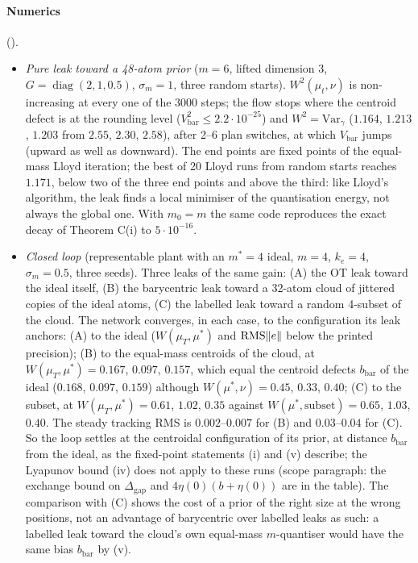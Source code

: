 \paragraph{Numerics} ().
\begin{itemize}
  \item \emph{Pure leak toward a 48-atom prior} ($m = 6$, lifted dimension 3, $G = \operatorname{diag}(2,1,0.5)$,
    $\sigma_m = 1$, three random starts). $W^2(\mu_t,\nu)$ is non-increasing at every one of the 3000 steps; the flow
    stops where the centroid defect is at the rounding level ($V_{\mathrm{bar}}^2 \le 2.2\cdot10^{-25}$) and
    $W^2 = \mathrm{Var}_\gamma$ ($1.164$, $1.213$, $1.203$ from $2.55$, $2.30$, $2.58$), after 2--6 plan switches, at
    which $V_{\mathrm{bar}}$ jumps (upward as well as downward). The end points are fixed points of the equal-mass
    Lloyd iteration; the best of 20 Lloyd runs from random starts reaches $1.171$, below two of the three end points
    and above the third: like Lloyd's algorithm, the leak finds a local minimiser of the quantisation energy, not
    always the global one. With $m_0 = m$ the same code reproduces the exact decay of Theorem C(i) to
    $5\cdot10^{-16}$.
  \item \emph{Closed loop} (representable plant with an $m^* = 4$ ideal, $m = 4$, $k_e = 4$, $\sigma_m = 0.5$, three
    seeds). Three leaks of the same gain: (A) the OT leak toward the ideal itself, (B) the barycentric leak toward a
    32-atom cloud of jittered copies of the ideal atoms, (C) the labelled leak toward a random 4-subset of the cloud.
    The network converges, in each case, to the configuration its leak anchors: (A) to the ideal ($W(\mu_T,\mu^*)$ and
    $\operatorname{RMS}\lVert e\rVert$ below the printed precision); (B) to the equal-mass centroids of the cloud, at
    $W(\mu_T,\mu^*) = 0.167$, $0.097$, $0.157$, which equal the centroid defects $b_{\mathrm{bar}}$ of the ideal
    ($0.168$, $0.097$, $0.159$) although $W(\mu^*,\nu) = 0.45$, $0.33$, $0.40$; (C) to the subset, at
    $W(\mu_T,\mu^*) = 0.61$, $1.02$, $0.35$ against $W(\mu^*,\text{subset}) = 0.65$, $1.03$, $0.40$. The steady
    tracking RMS is $0.002$--$0.007$ for (B) and $0.03$--$0.04$ for (C). So the loop settles at the centroidal
    configuration of its prior, at distance $b_{\mathrm{bar}}$ from the ideal, as the fixed-point statements (i) and
    (v) describe; the Lyapunov bound (iv) does not apply to these runs (scope paragraph: the exchange bound on
    $\Delta_{\mathrm{gap}}$ and $4\eta(0)(b+\eta(0))$ are in the table). The comparison with (C) shows the cost of a
    prior of the right size at the wrong positions, not an advantage of barycentric over labelled leaks as such: a
    labelled leak toward the cloud's own equal-mass $m$-quantiser would have the same bias $b_{\mathrm{bar}}$ by (v).
\end{itemize}
